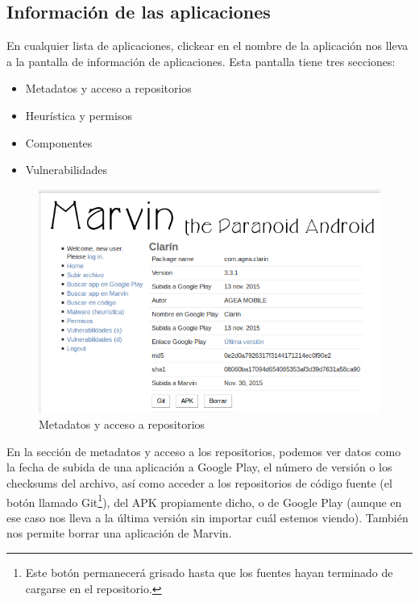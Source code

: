 \documentclass[11pt]{article}
\begin{document}
\subsection{Información de las aplicaciones}\label{appinfo}
En cualquier lista de aplicaciones, clickear en el nombre de la aplicación nos lleva a la pantalla de información de aplicaciones. Esta pantalla tiene tres secciones: 
\begin{itemize}
\item Metadatos y acceso a repositorios
\item Heurística y permisos
\item Componentes
\item Vulnerabilidades
\end{itemize}
\begin{figure}[H]
\begin{center}
\includegraphics[width=\textwidth]{graphics/marvin_app1.png}
\caption{Metadatos y acceso a repositorios}
\end{center}
\end{figure}

En la sección de metadatos y acceso a los repositorios, podemos ver datos como la fecha de subida de una aplicación a Google Play, el número de versión o los checksums del archivo, así como acceder a los repositorios de código fuente (el botón llamado Git\footnote{Este botón permanecerá grisado hasta que los fuentes hayan terminado de cargarse en el repositorio.}), del APK propiamente dicho, o de Google Play (aunque en ese caso nos lleva a la última versión sin importar cuál estemos viendo). También nos permite borrar una aplicación de Marvin.
\end{document}
